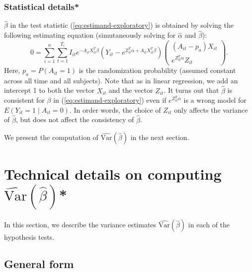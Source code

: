 \documentclass[11pt]{article}
\begin{document}
\subsubsection{Statistical details{*} \label{subsec:Technical-details-3}}

$\hat{\beta}$ in the test statistic (\ref{eq:estimand-exploratory})
is obtained by solving the following estimating equation (simutaneously
solving for $\hat{\alpha}$ and $\hat{\beta}$):
\begin{equation}
0=\sum_{i=1}^{n}\sum_{t=1}^{T_i} I_{it} e^{-A_{it}X_{it}^{T}\beta}\left(Y_{it}-e^{Z_{it}^{T}\alpha+A_{it}X_{it}^{T}\beta}\right)\begin{pmatrix}(A_{it}-p_{a})X_{it}\\
e^{Z_{it}^{T}\alpha}Z_{it}
\end{pmatrix}.\label{eq:ee-exploratory}
\end{equation}
Here, $p_{a}=P(A_{it}=1)$ is the randomization probability (assumed
constant across all time and all subjects). Note that as in linear
regression, we add an intercept 1 to both the vector $X_{it}$ and
the vector $Z_{it}$. It turns out that $\hat{\beta}$ is consistent
for $\beta$ in (\ref{eq:estimand-exploratory}) even if $e^{Z_{it}^{T}\alpha}$
is a wrong model for $E(Y_{it}=1\mid A_{it}=0)$. In order words,
the choice of $Z_{it}$ only affects the variance of $\hat{\beta}$,
but does not affect the consistency of $\hat{\beta}$.

We present the computation of $\widehat{\text{Var}}(\hat{\beta})$ in the next section.

\section{Technical details on computing $\widehat{\text{Var}}(\hat{\beta})${*}}
\label{sec:var}

In this section, we describe the variance estimates $\widehat{\text{Var}}(\hat{\beta})$
in each of the hypothesis tests.

\subsection{General form}
\end{document}

